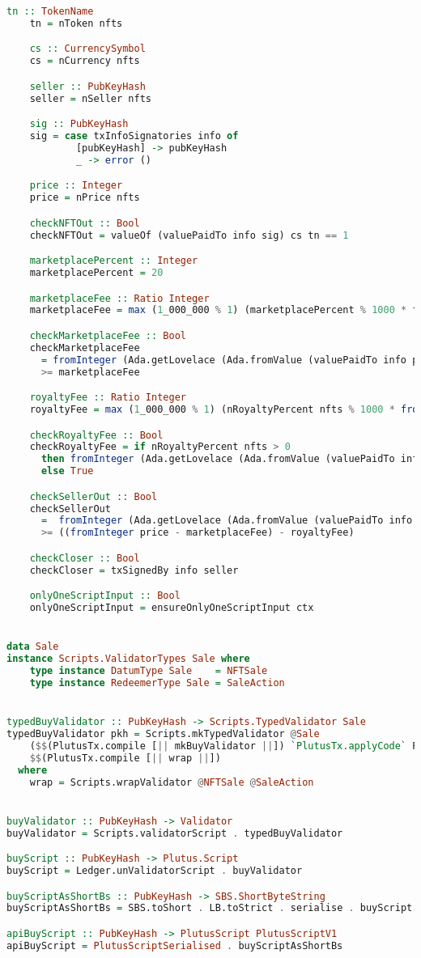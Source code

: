 \begin{lstlisting}[language=haskell, caption=Plutus Code for Marketplace Contract]
    tn :: TokenName
    tn = nToken nfts

    cs :: CurrencySymbol
    cs = nCurrency nfts

    seller :: PubKeyHash
    seller = nSeller nfts

    sig :: PubKeyHash
    sig = case txInfoSignatories info of
            [pubKeyHash] -> pubKeyHash
            _ -> error ()

    price :: Integer
    price = nPrice nfts

    checkNFTOut :: Bool
    checkNFTOut = valueOf (valuePaidTo info sig) cs tn == 1

    marketplacePercent :: Integer
    marketplacePercent = 20

    marketplaceFee :: Ratio Integer
    marketplaceFee = max (1_000_000 % 1) (marketplacePercent % 1000 * fromInteger price)

    checkMarketplaceFee :: Bool
    checkMarketplaceFee
      = fromInteger (Ada.getLovelace (Ada.fromValue (valuePaidTo info pkh)))
      >= marketplaceFee

    royaltyFee :: Ratio Integer
    royaltyFee = max (1_000_000 % 1) (nRoyaltyPercent nfts % 1000 * fromInteger price)

    checkRoyaltyFee :: Bool
    checkRoyaltyFee = if nRoyaltyPercent nfts > 0
      then fromInteger (Ada.getLovelace (Ada.fromValue (valuePaidTo info $ nRoyalty nfts))) >= royaltyFee
      else True

    checkSellerOut :: Bool
    checkSellerOut
      =  fromInteger (Ada.getLovelace (Ada.fromValue (valuePaidTo info seller)))
      >= ((fromInteger price - marketplaceFee) - royaltyFee)

    checkCloser :: Bool
    checkCloser = txSignedBy info seller

    onlyOneScriptInput :: Bool
    onlyOneScriptInput = ensureOnlyOneScriptInput ctx


data Sale
instance Scripts.ValidatorTypes Sale where
    type instance DatumType Sale    = NFTSale
    type instance RedeemerType Sale = SaleAction


typedBuyValidator :: PubKeyHash -> Scripts.TypedValidator Sale
typedBuyValidator pkh = Scripts.mkTypedValidator @Sale
    ($$(PlutusTx.compile [|| mkBuyValidator ||]) `PlutusTx.applyCode` PlutusTx.liftCode pkh)
    $$(PlutusTx.compile [|| wrap ||])
  where
    wrap = Scripts.wrapValidator @NFTSale @SaleAction


buyValidator :: PubKeyHash -> Validator
buyValidator = Scripts.validatorScript . typedBuyValidator

buyScript :: PubKeyHash -> Plutus.Script
buyScript = Ledger.unValidatorScript . buyValidator

buyScriptAsShortBs :: PubKeyHash -> SBS.ShortByteString
buyScriptAsShortBs = SBS.toShort . LB.toStrict . serialise . buyScript

apiBuyScript :: PubKeyHash -> PlutusScript PlutusScriptV1
apiBuyScript = PlutusScriptSerialised . buyScriptAsShortBs
\end{lstlisting}

